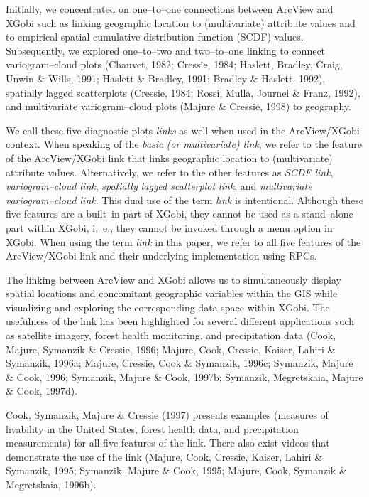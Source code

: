 Initially, we concentrated on one--to--one connections between
ArcView and XGobi such as linking geographic location to (multivariate)
attribute values and to empirical
spatial cumulative distribution function (SCDF) values.
Subsequently, we explored one--to--two and two--to--one linking
to connect variogram--cloud plots (Chauvet, 1982; Cressie, 1984;
Haslett, Bradley, Craig, Unwin \& Wills, 1991; Haslett \& Bradley,
1991; Bradley \& Haslett, 1992), spatially lagged scatterplots
(Cressie, 1984; Rossi, Mulla, Journel \& Franz, 1992), and
multivariate variogram--cloud plots (Majure \& Cressie, 1998) 
to geography. 

We call these five diagnostic plots {\it links} as well when used
in the ArcView/XGobi context.
When speaking of the {\it basic (or multivariate) link},
we refer to the feature of the ArcView/XGobi link that links 
geographic location to (multivariate) attribute values.
Alternatively,
we refer to the other features as
{\it SCDF link}, {\it variogram--cloud link}, 
{\it spatially lagged scatterplot link},
and {\it multivariate variogram--cloud link}. This dual use
of the term {\it link} is intentional. Although these five
features are a built--in part of XGobi, they cannot be used
as a stand--alone part within XGobi, i.~e., they cannot be invoked
through a menu option in XGobi. 
When using the term {\it link} in this paper, we refer to
all five features of the ArcView/XGobi link and their
underlying implementation using RPCs.

The linking between ArcView and XGobi allows us to simultaneously display 
spatial locations and concomitant
geographic variables within the GIS while visualizing and exploring
the corresponding data space within XGobi. The
usefulness of the link has been highlighted for several different
applications such as satellite imagery, forest health monitoring, and
precipitation data (Cook, Majure, Symanzik \& Cressie, 1996; Majure,
Cook, Cressie, Kaiser, Lahiri \& Symanzik, 1996a; Majure, Cressie,
Cook \& Symanzik, 1996c; Symanzik, Majure \& Cook, 1996; Symanzik,
Majure \& Cook, 1997b; Symanzik, Megretskaia, Majure \& Cook, 1997d).  

Cook, Symanzik, Majure \& Cressie (1997)
presents examples (measures of livability in the United States, forest
health data, and precipitation measurements) for all five features of
the link. There also exist videos that demonstrate the use of the link
(Majure, Cook, Cressie, Kaiser, Lahiri \& Symanzik, 1995; Symanzik,
Majure \& Cook, 1995; Majure, Cook, Symanzik \& Megretskaia, 1996b).


